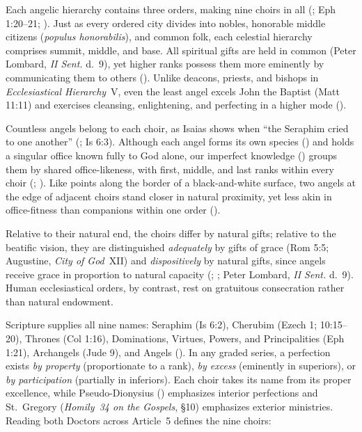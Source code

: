 Each angelic hierarchy contains three orders, making nine choirs in all (; Eph 1:20--21; ). Just as every ordered city divides into nobles, honorable middle citizens (\emph{populus honorabilis}), and common folk, each celestial hierarchy comprises summit, middle, and base. All spiritual gifts are held in common (Peter Lombard, \emph{II Sent.} d.~9), yet higher ranks possess them more eminently by communicating them to others (). Unlike deacons, priests, and bishops in \emph{Ecclesiastical Hierarchy}~V, even the least angel excels John the Baptist (Matt 11:11) and exercises cleansing, enlightening, and perfecting in a higher mode ().

Countless angels belong to each choir, as Isaias shows when ``the Seraphim cried to one another'' (; Is 6:3). Although each angel forms its own species () and holds a singular office known fully to God alone, our imperfect knowledge () groups them by shared office-likeness, with first, middle, and last ranks within every choir (; ). Like points along the border of a black-and-white surface, two angels at the edge of adjacent choirs stand closer in natural proximity, yet less akin in office-fitness than companions within one order ().

Relative to their natural end, the choirs differ by natural gifts; relative to the beatific vision, they are distinguished \emph{adequately} by gifts of grace (Rom 5:5; Augustine, \emph{City of God}~XII) and \emph{dispositively} by natural gifts, since angels receive grace in proportion to natural capacity (; ; Peter Lombard, \emph{II Sent.} d.~9). Human ecclesiastical orders, by contrast, rest on gratuitous consecration rather than natural endowment.

Scripture supplies all nine names: Seraphim (Is 6:2), Cherubim (Ezech 1; 10:15--20), Thrones (Col 1:16), Dominations, Virtues, Powers, and Principalities (Eph 1:21), Archangels (Jude 9), and Angels (). In any graded series, a perfection exists \emph{by property} (proportionate to a rank), \emph{by excess} (eminently in superiors), or \emph{by participation} (partially in inferiors). Each choir takes its name from its proper excellence, while Pseudo-Dionysius () emphasizes interior perfections and St.~Gregory (\emph{Homily~34 on the Gospels}, \S10) emphasizes exterior ministries. Reading both Doctors across Article~5 defines the nine choirs:

